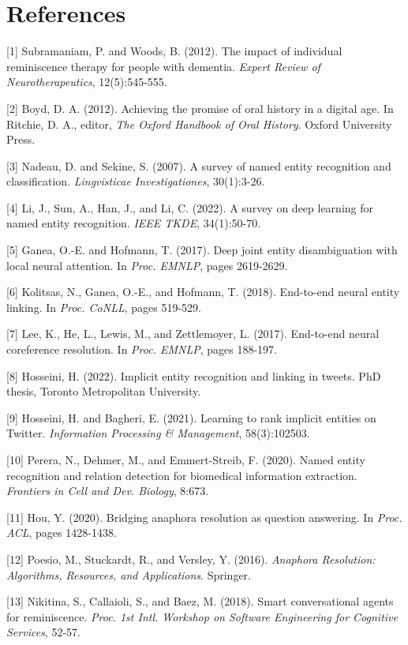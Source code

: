 ﻿\documentclass{article}
\begin{document}
\section*{References}\label{references}

{[}1{]} Subramaniam, P. and Woods, B. (2012). The impact of individual
reminiscence therapy for people with dementia. \emph{Expert Review of
Neurotherapeutics}, 12(5):545-555.

{[}2{]} Boyd, D. A. (2012). Achieving the promise of oral history in a
digital age. In Ritchie, D. A., editor, \emph{The Oxford Handbook of
Oral History}. Oxford University Press.

{[}3{]} Nadeau, D. and Sekine, S. (2007). A survey of named entity
recognition and classification. \emph{Lingvisticae Investigationes},
30(1):3-26.

{[}4{]} Li, J., Sun, A., Han, J., and Li, C. (2022). A survey on deep
learning for named entity recognition. \emph{IEEE TKDE}, 34(1):50-70.

{[}5{]} Ganea, O.-E. and Hofmann, T. (2017). Deep joint entity
disambiguation with local neural attention. In \emph{Proc. EMNLP}, pages
2619-2629.

{[}6{]} Kolitsas, N., Ganea, O.-E., and Hofmann, T. (2018). End-to-end
neural entity linking. In \emph{Proc. CoNLL}, pages 519-529.

{[}7{]} Lee, K., He, L., Lewis, M., and Zettlemoyer, L. (2017).
End-to-end neural coreference resolution. In \emph{Proc. EMNLP}, pages
188-197.

{[}8{]} Hosseini, H. (2022). Implicit entity recognition and linking in
tweets. PhD thesis, Toronto Metropolitan University.

{[}9{]} Hosseini, H. and Bagheri, E. (2021). Learning to rank implicit
entities on Twitter. \emph{Information Processing \& Management},
58(3):102503.

{[}10{]} Perera, N., Dehmer, M., and Emmert-Streib, F. (2020). Named
entity recognition and relation detection for biomedical information
extraction. \emph{Frontiers in Cell and Dev. Biology}, 8:673.

{[}11{]} Hou, Y. (2020). Bridging anaphora resolution as question
answering. In \emph{Proc. ACL}, pages 1428-1438.

{[}12{]} Poesio, M., Stuckardt, R., and Versley, Y. (2016).
\emph{Anaphora Resolution: Algorithms, Resources, and Applications}.
Springer.

{[}13{]} Nikitina, S., Callaioli, S., and Baez, M. (2018). Smart
conversational agents for reminiscence. \emph{Proc. 1st Intl. Workshop
on Software Engineering for Cognitive Services}, 52-57.
\end{document}
